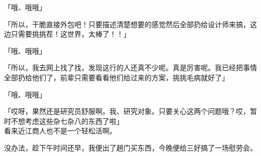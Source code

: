 「哦、哦哦」

「所以，干脆直接外包吧！只要描述清楚想要的感觉然后全部扔给设计师来搞，这边只需要挑挑茬！这世界，太棒了！！」

「哦、哦哦」

「所以，我去网上找了找，发现这行的人还真不少呢。真是厉害呢。我已经把事情全部扔给他们了，前辈只需要看看他们给过来的方案，挑挑毛病就好了」

「哦、哦哦」

「哎呀，果然还是研究员舒服啊。我、研究对象。只要关心这两个问题哦？哎，暂时不想考虑这些杂七杂八的东西了啦」\\

看来近江商人也不是一个轻松活啊。

没办法，趁下午时间还早，我便出了趟门买东西，今晚便给三好搞了一场慰劳会。\\
